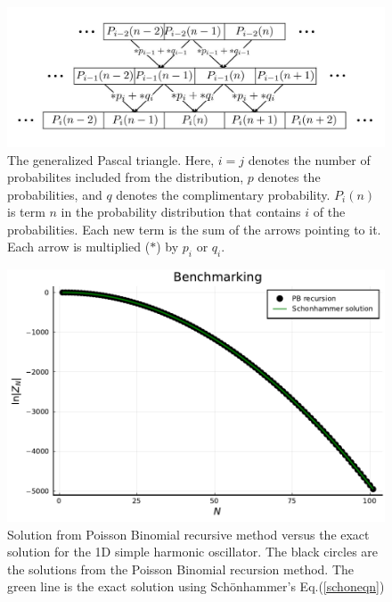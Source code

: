 \begin{figure}[H]
    \centering
    \includegraphics[scale=0.8]{figures/pdf/PBrecursion.jpg}
    \caption{The generalized Pascal triangle. Here, $i=j$ denotes the number of probabilites included from the distribution, $p$ denotes the probabilities, and $q$ denotes the complimentary probability. $P_i(n)$ is term $n$ in the probability distribution that contains $i$ of the probabilities. Each new term is the sum of the arrows pointing to it. Each arrow is multiplied ($*$) by $p_i$ or $q_i$.}
    \label{fig:General Poisson Binomial Recursion}
\end{figure}
\begin{figure}[H]
    \centering
    \includegraphics[scale=0.75]{figures/pdf/Benchmarking.pdf}
    \caption{Solution from Poisson Binomial recursive method versus the exact solution for the 1D simple harmonic oscillator. The black circles are the solutions from the Poisson Binomial recursion method. The green line is the exact solution using Sch\"onhammer's Eq.(\ref{schoneqn})}
    \label{fig: schon solution}
\end{figure}
